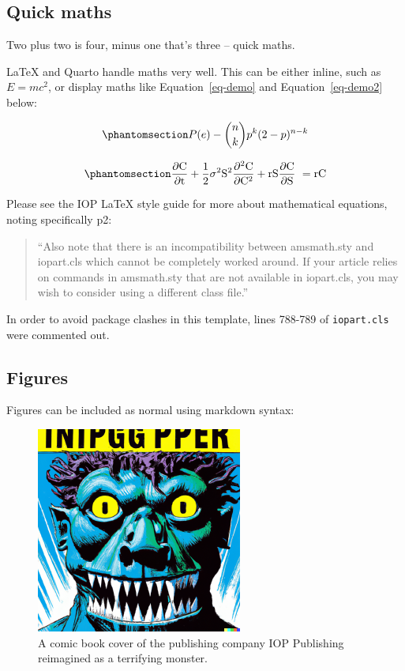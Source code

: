 \documentclass[
  12pt]{iopart}
\begin{document}
\subsection{Quick maths}\label{quick-maths}

Two plus two is four, minus one that's three -- quick maths.

{\LaTeX} and Quarto handle maths very well. This can be either inline,
such as \(E = mc^{2}\), or display maths like Equation~\ref{eq-demo} and
Equation~\ref{eq-demo2} below:

\begin{equation}\phantomsection\label{eq-demo}{
P(e) - {n \choose k} p^k (2-p)^{n-k}
}\end{equation}

\begin{equation}\phantomsection\label{eq-demo2}{
\frac{\partial \mathrm C}{ \partial \mathrm t } + \frac{1}{2}\sigma^{2} \mathrm S^{2}
\frac{\partial^{2} \mathrm C}{\partial \mathrm C^2}
  + \mathrm r \mathrm S \frac{\partial \mathrm C}{\partial \mathrm S}\ =
  \mathrm r \mathrm C 
}\end{equation}

Please see the IOP {\LaTeX} style guide for more about mathematical
equations, noting specifically p2:

\begin{quote}
``Also note that there is an incompatibility between amsmath.sty and
iopart.cls which cannot be completely worked around. If your article
relies on commands in amsmath.sty that are not available in iopart.cls,
you may wish to consider using a different class file.''
\end{quote}

In order to avoid package clashes in this template, lines 788-789 of
\texttt{iopart.cls} were commented out.

\subsection{Figures}\label{sec-figures}

Figures can be included as normal using markdown syntax:

\begin{figure}[H]

{\centering \includegraphics{fig.png}

}

\caption{A comic book cover of the publishing company IOP Publishing
reimagined as a terrifying monster.}

\end{figure}%
\end{document}
